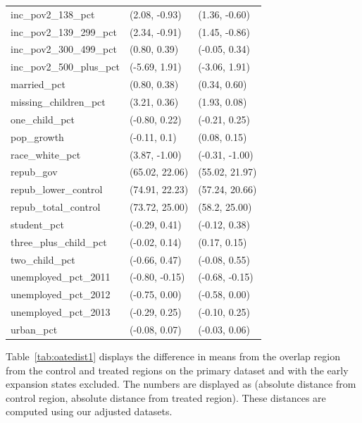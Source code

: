 \begin{table}[ht]
\begin{tabular}{lll}
  inc\_pov2\_138\_pct & (2.08, -0.93) & (1.36, -0.60) \\ 
  inc\_pov2\_139\_299\_pct & (2.34, -0.91) & (1.45, -0.86) \\ 
  inc\_pov2\_300\_499\_pct & (0.80, 0.39) & (-0.05, 0.34) \\ 
  inc\_pov2\_500\_plus\_pct & (-5.69, 1.91) & (-3.06, 1.91) \\ 
  married\_pct & (0.80, 0.38) & (0.34, 0.60) \\ 
  missing\_children\_pct & (3.21, 0.36) & (1.93, 0.08) \\ 
  one\_child\_pct & (-0.80, 0.22) & (-0.21, 0.25) \\ 
  pop\_growth & (-0.11, 0.1) & (0.08, 0.15) \\ 
  race\_white\_pct & (3.87, -1.00) & (-0.31, -1.00) \\ 
  repub\_gov & (65.02, 22.06) & (55.02, 21.97) \\ 
  repub\_lower\_control & (74.91, 22.23) & (57.24, 20.66) \\ 
  repub\_total\_control & (73.72, 25.00) & (58.2, 25.00) \\ 
  student\_pct & (-0.29, 0.41) & (-0.12, 0.38) \\ 
  three\_plus\_child\_pct & (-0.02, 0.14) & (0.17, 0.15) \\ 
  two\_child\_pct & (-0.66, 0.47) & (-0.08, 0.55) \\ 
  unemployed\_pct\_2011 & (-0.80, -0.15) & (-0.68, -0.15) \\ 
  unemployed\_pct\_2012 & (-0.75, 0.00) & (-0.58, 0.00) \\ 
  unemployed\_pct\_2013 & (-0.29, 0.25) & (-0.10, 0.25) \\ 
  urban\_pct & (-0.08, 0.07) & (-0.03, 0.06) \\ 
   \hline
\end{tabular}
\end{table}

Table~\ref{tab:oatedist1} displays the difference in means from the overlap region from the control and treated regions on the primary dataset and with the early expansion states excluded. The numbers are displayed as (absolute distance from control region, absolute distance from treated region). These distances are computed using our adjusted datasets. 

